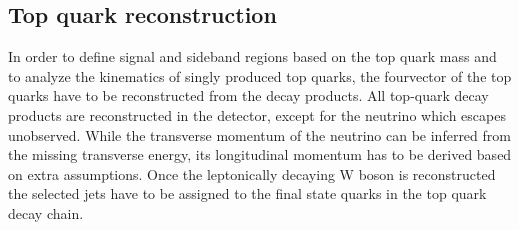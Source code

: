 %
%
%
%
%
\subsection{Top quark reconstruction}
\label{sec:topreco}

In order to define signal and sideband regions based on the top quark mass and to analyze the kinematics of singly produced top quarks, the fourvector of the top quarks have to be reconstructed from the decay products. All top-quark decay products are reconstructed in the detector, except for the neutrino which escapes unobserved. While the transverse momentum of the neutrino can be inferred from the missing transverse energy, its longitudinal momentum has to be derived based on  extra assumptions. Once the leptonically decaying W boson is reconstructed the selected jets have to be assigned to the final state quarks in the top quark decay chain.

